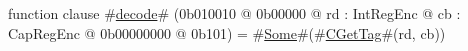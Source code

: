 function clause #\hyperref[zdecode]{decode}# (0b010010 @ 0b00000 @ rd : IntRegEnc @ cb : CapRegEnc @ 0b00000000 @ 0b101) = #\hyperref[zSome]{Some}#(#\hyperref[zCGetTag]{CGetTag}#(rd, cb))
